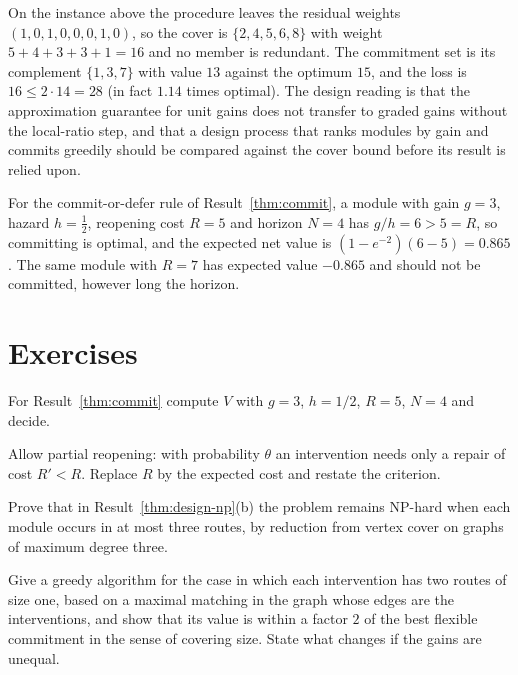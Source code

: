 On the instance above the procedure leaves the residual weights $(1,0,1,0,0,0,1,0)$, so the cover is $\{2,4,5,6,8\}$ with weight $5+4+3+3+1=16$ and no member is redundant. The commitment set is its complement $\{1,3,7\}$ with value $13$ against the optimum $15$, and the loss is $16\le2\cdot14=28$ (in fact $1.14$ times optimal). The design reading is that the approximation guarantee for unit gains does not transfer to graded gains without the local-ratio step, and that a design process that ranks modules by gain and commits greedily should be compared against the cover bound before its result is relied upon.

For the commit-or-defer rule of Result~\ref{thm:commit}, a module with gain $g=3$, hazard $h=\tfrac12$, reopening cost $R=5$ and horizon $N=4$ has $g/h=6>5=R$, so committing is optimal, and the expected net value is $(1-e^{-2})(6-5)=0.865$. The same module with $R=7$ has expected value $-0.865$ and should not be committed, however long the horizon.

\section*{Exercises}

\begin{exercise}
For Result~\ref{thm:commit} compute $V$ with $g=3$, $h=1/2$, $R=5$, $N=4$ and decide.
\end{exercise}

\begin{exercise}
Allow partial reopening: with probability $\theta$ an intervention needs only a repair of cost $R'<R$. Replace $R$ by the expected cost and restate the criterion.
\end{exercise}

\begin{exercise}
Prove that in Result~\ref{thm:design-np}(b) the problem remains NP-hard when each module occurs in at most three routes, by reduction from vertex cover on graphs of maximum degree three.
\end{exercise}

\begin{exercise}
Give a greedy algorithm for the case in which each intervention has two routes of size one, based on a maximal matching in the graph whose edges are the interventions, and show that its value is within a factor $2$ of the best flexible commitment in the sense of covering size. State what changes if the gains are unequal.
\end{exercise}

